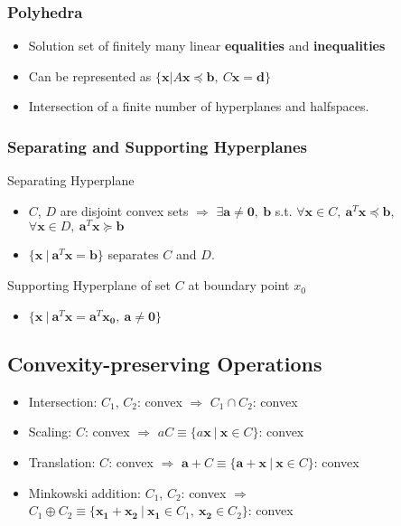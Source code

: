 \subsubsection*{Polyhedra}
\begin{itemize}
    \item Solution set of finitely many linear \textbf{equalities} and \textbf{inequalities}
    \item Can be represented as $\{\mathbf{x}|A\mathbf{x} \preceq \mathbf{b},~ C\mathbf{x} = \mathbf{d} \}$
    \item Intersection of a finite number of hyperplanes and halfspaces.
\end{itemize}

\subsubsection*{Separating and Supporting Hyperplanes}

Separating Hyperplane
\begin{itemize}
    \item $C$, $D$ are disjoint convex sets $\Rightarrow$ 
        $\exists \mathbf{a} \neq \mathbf{0},~\mathbf{b}$ s.t. 
        $\forall \mathbf{x} \in C,~\mathbf{a}^T\mathbf{x} \preceq \mathbf{b}$,
        $\forall \mathbf{x} \in D,~\mathbf{a}^T\mathbf{x} \succeq \mathbf{b}$
    \item $\{\mathbf{x}~|~\mathbf{a}^T\mathbf{x} = \mathbf{b}\}$ separates $C$ and $D$.
\end{itemize}

Supporting Hyperplane of set $C$ at boundary point $x_0$
\begin{itemize}
    \item $\{\mathbf{x}~|~\mathbf{a}^T\mathbf{x} = \mathbf{a}^T\mathbf{x_0},~\mathbf{a}\neq\mathbf{0}\}$
\end{itemize}

\subsection{Convexity-preserving Operations}

\begin{itemize}
    \item Intersection: $C_1$, $C_2$: convex $\Rightarrow$ $C_1 \cap C_2$: convex
    \item Scaling: $C$: convex $\Rightarrow$ $aC \equiv \{a\mathbf{x}~|~\mathbf{x} \in C\}$: convex
    \item Translation: $C$: convex $\Rightarrow$ $\mathbf{a} + C \equiv \{\mathbf{a}+\mathbf{x}~|~\mathbf{x}\in C\}$: convex
    \item Minkowski addition: $C_1$, $C_2$: convex $\Rightarrow$ $C_1 \oplus C_2 \equiv \{\mathbf{x_1}+\mathbf{x_2}~|~\mathbf{x_1}\in C_1,~\mathbf{x_2}\in C_2\}$: convex
\end{itemize}
